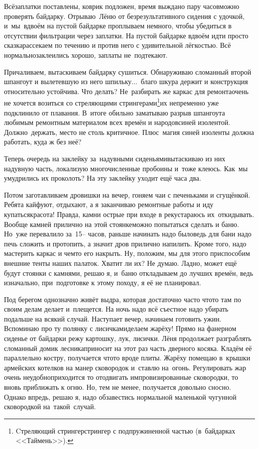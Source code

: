 Всё\mdash заплатки поставлены, коврик подложен, время выждано пару часов\mdash можно проверять байдарку. Отрываю~Лёню от безрезультативного сидения с удочкой, и~мы~вдвоём на пустой байдарке проплываем немного, чтобы убедиться в отсутствии фильтрации через заплатки. На пустой байдарке вдвоём идти просто сказка\mdash рассекаем по течению и против него с удивительной лёгкостью. Всё нормально\mdash заклеились хорошо, заплаты не~подтекают. 

Причаливаем, вытаскиваем байдарку сушиться. Обнаруживаю сломанный второй шпангоут и вылетевшую из него шпильку$\ldots$~благо шкура держит и конструкция относительно устойчива. Что делать? Не~разбирать же каркас для ремонта\mdash очень не хочется возиться со стреляющими стрингерами\footnote[1]{Cтреляющий стрингер\mdash стрингер с подпружиненной частью (в~байдарках <<Таймень>>).}\mdash их непременно уже подклинило от плавания. В~итоге обильно заматываю разрыв шпангоута любимым ремонтным материалом всех времён и народов\mdash синей изолентой. Должно~держать, место не столь критичное. Плюс~магия синей изоленты должна работать, куда ж без неё? 

Теперь очередь на заклейку за~надувными сиденьями\mdash вытаскиваю из них надувную часть, локализую многочисленные пробоины и~тоже клеюсь. Как~мы умудрились их проколоть? На эту заклейку уходит ещё часа два. 

Потом заготавливаем дровишки на вечер, гоняем чаи с печеньками и сгущёнкой. Ребята кайфуют, отдыхают, а я заканчиваю ремонтные работы и иду купаться\mdash красота! Правда, камни острые при входе в реку\mdash стараюсь их~откидывать. Вообще камней прилично на этой стоянке\mdash можно попытаться сделать и баню. Но~уже перевалило за~{15\thinspace\nobreakdash--} часов, раньше начинать надо было\mdash ведь для бани надо печь сложить и протопить, а значит дров прилично напилить. Кроме того, надо мастерить каркас и чем\sdash то его накрыть. Ну, положим, мы для этого приспособим внешние тенты наших палаток. Хватит ли их? Не думаю. Ладно, может ещё будут стоянки с камнями, решаю я, и~баню откладываем до лучших времён, ведь изначально, при~подготовке к этому походу, я её не планировал.  

Под берегом однозначно живёт выдра, которая достаточно часто что\sdash то там по своим делам делает и~плещется. На ночь надо всё съестное надо убирать подальше на всякий случай. Наступает вечер, начинаем готовить ужин. Вспоминаю про ту полянку с лисичками\mdash делаем жарёху! Прямо на фанерном сиденье от байдарки режу картошку, лук, лисички. Лёня продолжает разграблять сломанный домик лесника\mdash приносит на этот раз часть дверного косяка. Кладём её параллельно костру, получается что\sdash то вроде плиты. Жарёху помещаю в~крышки армейских котелков на манер сковородок и~ставлю на~огонь. Регулировать жар очень неудобно\mdash приходится то отодвигать импровизированные сковородки, то вновь приближать к огню. Но, тем не менее, получается довольно сносно. Однако впредь, решаю я, надо обзавестись нормальной маленькой чугунной сковородкой на~такой~случай. 

